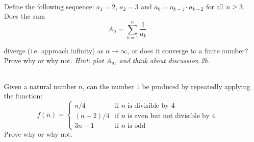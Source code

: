 \documentclass[11pt]{article}
\newif\ifsolutions
\begin{document}
\begin{qunlist}
\begin{itemize}
\end{itemize}



%
%
%



 \\
Define the following sequence: $a_1 =2$, $a_2 = 3$ and $a_k = a_{k-1} \cdot a_{k-2}$ for all $n \geq 3$. \\ 
Does the sum 
\[ A_n = \sum_{k=1}^n \frac{1}{a_k} \]

diverge (i.e. approach infinity) as $n \to \infty$, or does it converge to a finite number?  
Prove why or why not.
{\em Hint: plot $A_n$, and think about discussion 2b.}

\ifsolutions
\textbf{Solutions:}
It does converge. We can first use strong induction to prove the claim
\[ a_k > 2^k, \quad \forall k \geq 4 \] 

For the base cases we have $a_4 = a_3 \cdot a_2 = 6 \cdot 3 = 18 > 2^4$ 
and $a_5 = a_4 \cdot a_3 = 18 \cdot 6 = 108 > 2^5$. Then for the inductive step we have
\[ a_{k+1} = a_k \cdot a_{k-1} > 2^k \cdot 2^{k-1} = 2^{2k-1} > 2^{k+1} \]

Therefore:
\[ \sum_{k=4}^n \frac{1}{a_k} < \sum_{k=4}^n \frac{1}{2^k} \]

Since the RHS converges as $n \to \infty$, we know the LHS converges.  
Adding a constant (i.e. the first three terms) does not change the fact that it converges.
\fi



 \\ 
Given a natural number $n$, can the number $1$ be produced 
by repeatedly applying the function:
\[ f(n) = \left\{ 
    \begin{array}{cl} 
        n/4 & \text{if $n$ is divisible by 4} \\
        (n+2)/4 & \text{if $n$ is even but not divisible by 4} \\
        3n - 1 & \text{if $n$ is odd} 
    \end{array} 
\right. \]
Prove why or why not.


\end{qunlist}
\end{document}
